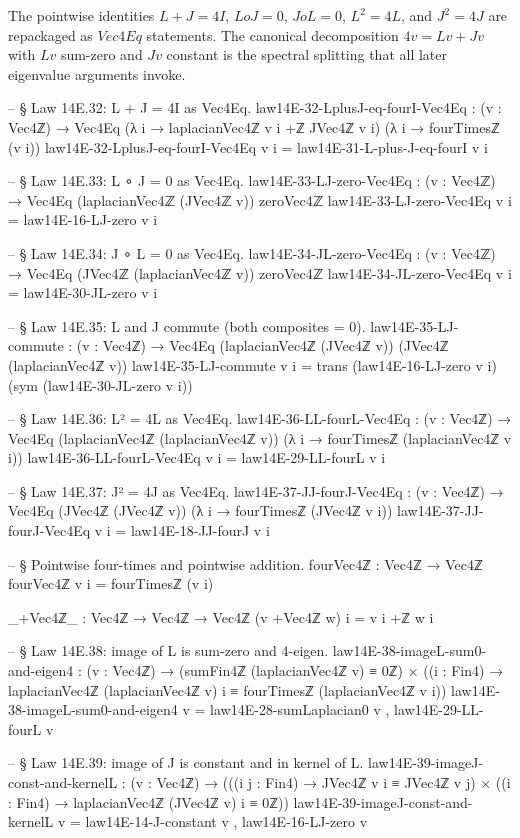 \documentclass[11pt,a4paper]{book}
\def\circ{o}%
\def\mathrm#1{#1}%
\begin{document}
The pointwise identities $L + J = 4I$, $L \circ J = 0$, $J \circ L = 0$, $L^2 = 4L$, and $J^2 = 4J$ are repackaged as $\mathrm{Vec4Eq}$ statements.
The canonical decomposition $4v = Lv + Jv$ with $Lv$ sum-zero and $Jv$ constant is the spectral splitting that all later eigenvalue arguments invoke.

\begin{code}
-- § Law 14E.32: L + J = 4I as Vec4Eq.
law14E-32-LplusJ-eq-fourI-Vec4Eq : (v : Vec4ℤ) →
  Vec4Eq (λ i → laplacianVec4ℤ v i +ℤ JVec4ℤ v i) (λ i → fourTimesℤ (v i))
law14E-32-LplusJ-eq-fourI-Vec4Eq v i = law14E-31-L-plus-J-eq-fourI v i

-- § Law 14E.33: L ∘ J = 0 as Vec4Eq.
law14E-33-LJ-zero-Vec4Eq : (v : Vec4ℤ) →
  Vec4Eq (laplacianVec4ℤ (JVec4ℤ v)) zeroVec4ℤ
law14E-33-LJ-zero-Vec4Eq v i = law14E-16-LJ-zero v i

-- § Law 14E.34: J ∘ L = 0 as Vec4Eq.
law14E-34-JL-zero-Vec4Eq : (v : Vec4ℤ) →
  Vec4Eq (JVec4ℤ (laplacianVec4ℤ v)) zeroVec4ℤ
law14E-34-JL-zero-Vec4Eq v i = law14E-30-JL-zero v i

-- § Law 14E.35: L and J commute (both composites = 0).
law14E-35-LJ-commute : (v : Vec4ℤ) →
  Vec4Eq (laplacianVec4ℤ (JVec4ℤ v)) (JVec4ℤ (laplacianVec4ℤ v))
law14E-35-LJ-commute v i =
  trans (law14E-16-LJ-zero v i) (sym (law14E-30-JL-zero v i))

-- § Law 14E.36: L² = 4L as Vec4Eq.
law14E-36-LL-fourL-Vec4Eq : (v : Vec4ℤ) →
  Vec4Eq (laplacianVec4ℤ (laplacianVec4ℤ v)) (λ i → fourTimesℤ (laplacianVec4ℤ v i))
law14E-36-LL-fourL-Vec4Eq v i = law14E-29-LL-fourL v i

-- § Law 14E.37: J² = 4J as Vec4Eq.
law14E-37-JJ-fourJ-Vec4Eq : (v : Vec4ℤ) →
  Vec4Eq (JVec4ℤ (JVec4ℤ v)) (λ i → fourTimesℤ (JVec4ℤ v i))
law14E-37-JJ-fourJ-Vec4Eq v i = law14E-18-JJ-fourJ v i

-- § Pointwise four-times and pointwise addition.
fourVec4ℤ : Vec4ℤ → Vec4ℤ
fourVec4ℤ v i = fourTimesℤ (v i)

_+Vec4ℤ_ : Vec4ℤ → Vec4ℤ → Vec4ℤ
(v +Vec4ℤ w) i = v i +ℤ w i

-- § Law 14E.38: image of L is sum-zero and 4-eigen.
law14E-38-imageL-sum0-and-eigen4 : (v : Vec4ℤ) →
  (sumFin4ℤ (laplacianVec4ℤ v) ≡ 0ℤ) × ((i : Fin4) → laplacianVec4ℤ (laplacianVec4ℤ v) i ≡ fourTimesℤ (laplacianVec4ℤ v i))
law14E-38-imageL-sum0-and-eigen4 v =
  law14E-28-sumLaplacian0 v , law14E-29-LL-fourL v

-- § Law 14E.39: image of J is constant and in kernel of L.
law14E-39-imageJ-const-and-kernelL : (v : Vec4ℤ) →
  (((i j : Fin4) → JVec4ℤ v i ≡ JVec4ℤ v j) × ((i : Fin4) → laplacianVec4ℤ (JVec4ℤ v) i ≡ 0ℤ))
law14E-39-imageJ-const-and-kernelL v =
  law14E-14-J-constant v , law14E-16-LJ-zero v


\end{code}
\end{document}
